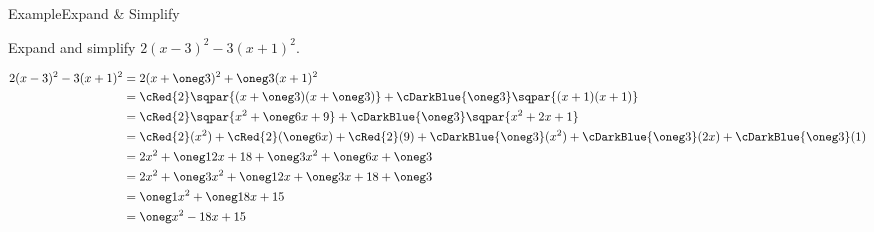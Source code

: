 \documentclass[\string~/GitHub/sthlmNordBeamerTheme/sthlmNordLightDemo.tex]{subfiles}
\begin{document}
\begin{frame}{Example}{Expand \& Simplify}

	\prob Expand and simplify \( 2(x - 3)^2 - 3(x + 1)^2 \).


	\framebreak
	\soln \hfill
	\begin{align*}
		2(x - 3)^2 - 3(x + 1)^2 & = 2(x + \oneg  3)^2 + \oneg  3(x + 1)^2                                                                                              \\
		                        & = \cRed{2}\sqpar{(x + \oneg 3)(x + \oneg 3)} + \cDarkBlue{ \oneg 3}\sqpar{(x + 1)(x + 1)}                                            \\
		                        & = \cRed{2}\sqpar{x^2 + \oneg 6x + 9} + \cDarkBlue{ \oneg 3} \sqpar{x^2 + 2x + 1}                                                     \\
		                        & = \cRed{2}(x^2) + \cRed{2}( \oneg 6x) + \cRed{2}(9) + \cDarkBlue{ \oneg 3}(x^2) + \cDarkBlue{ \oneg 3}(2x) + \cDarkBlue{ \oneg 3}(1) \\
		                        & = 2x^2 + \oneg 12x + 18 + \oneg 3x^2 + \oneg 6x + \oneg 3                                                                            \\
		                        & = 2x^2 + \oneg 3x^2 + \oneg 12x + \oneg 3x + 18 + \oneg 3                                                                            \\
		                        & = \oneg 1x^2 + \oneg 18x + 15                                                                                                        \\
		                        & = \oneg x^2 - 18x + 15
	\end{align*}
\end{frame}
\end{document}
